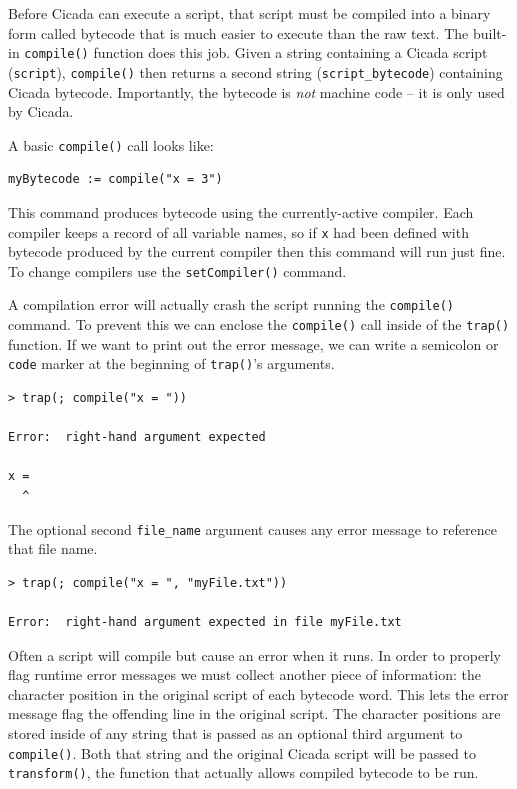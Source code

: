 \documentclass{article}
\newenvironment{code}{
       \begin{list}{}{
               \setlength{\leftmargin}{.4in}
               \setlength{\rightmargin}{0in}
               \setlength{\topsep}{.2in}
       }
       \small
       \item[] }
       { \end{list}   }
\begin{document}
Before Cicada can execute a script, that script must be compiled into a binary form called bytecode that is much easier to execute than the raw text.  The built-in \texttt{compile()} function does this job.  Given a string containing a Cicada script (\verb#script#), \verb#compile()# then returns a second string (\verb#script_bytecode#) containing Cicada bytecode.  Importantly, the bytecode is \emph{not} machine code -- it is only used by Cicada.

A basic \verb#compile()# call looks like:

\begin{code} \begin{verbatim}
myBytecode := compile("x = 3")
\end{verbatim} \end{code}

\noindent This command produces bytecode using the currently-active compiler.  Each compiler keeps a record of all variable names, so if \verb#x# had been defined with bytecode produced by the current compiler then this command will run just fine.  To change compilers use the \verb#setCompiler()# command.

A compilation error will actually crash the script running the \verb#compile()# command.  To prevent this we can enclose the \verb#compile()# call inside of the \verb#trap()# function.  If we want to print out the error message, we can write a semicolon or \verb#code# marker at the beginning of \verb#trap()#'s arguments.

\begin{code} \begin{verbatim}
> trap(; compile("x = "))

Error:  right-hand argument expected

x =
  ^
\end{verbatim} \end{code}

\noindent The optional second \verb#file_name# argument causes any error message to reference that file name.

\begin{code} \begin{verbatim}
> trap(; compile("x = ", "myFile.txt"))

Error:  right-hand argument expected in file myFile.txt
\end{verbatim} \end{code}

Often a script will compile but cause an error when it runs.  In order to properly flag runtime error messages we must collect another piece of information:  the character position in the original script of each bytecode word.  This lets the error message flag the offending line in the original script.  The character positions are stored inside of any string that is passed as an optional third argument to \texttt{compile()}.  Both that string and the original Cicada script will be passed to \verb#transform()#, the function that actually allows compiled bytecode to be run.
\end{document}
